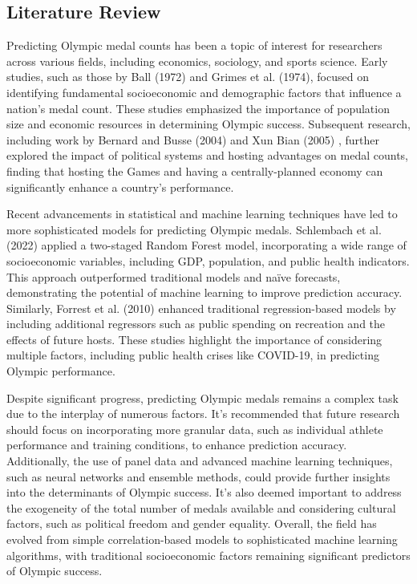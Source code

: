 \documentclass{mcmthesis}
\begin{document}
\subsection{Literature Review}

Predicting Olympic medal counts has been a topic of interest for researchers across various fields, including economics, sociology, and sports science. Early studies, such as those by Ball (1972) and Grimes et al. (1974), \cite{1} focused on identifying fundamental socioeconomic and demographic factors that influence a nation's medal count. These studies emphasized the importance of population size and economic resources in determining Olympic success. Subsequent research, including work by Bernard and Busse (2004) and Xun Bian (2005) \cite{2}, further explored the impact of political systems and hosting advantages on medal counts, finding that hosting the Games and having a centrally-planned economy can significantly enhance a country's performance.

Recent advancements in statistical and machine learning techniques have led to more sophisticated models for predicting Olympic medals. Schlembach et al. (2022) \cite{5} applied a two-staged Random Forest model, incorporating a wide range of socioeconomic variables, including GDP, population, and public health indicators. This approach outperformed traditional models and naïve forecasts, demonstrating the potential of machine learning to improve prediction accuracy. Similarly, Forrest et al. (2010) \cite{4} enhanced traditional regression-based models by including additional regressors such as public spending on recreation and the effects of future hosts. These studies highlight the importance of considering multiple factors, including public health crises like COVID-19, in predicting Olympic performance.

Despite significant progress, predicting Olympic medals remains a complex task due to the interplay of numerous factors. It's recommended that future research should focus on incorporating more granular data, such as individual athlete performance and training conditions, to enhance prediction accuracy. Additionally, the use of panel data and advanced machine learning techniques, such as neural networks and ensemble methods, could provide further insights into the determinants of Olympic success. It's also deemed important to address the exogeneity of the total number of medals available and considering cultural factors, such as political freedom and gender equality. Overall, the field has evolved from simple correlation-based models to sophisticated machine learning algorithms, with traditional socioeconomic factors remaining significant predictors of Olympic success.
\end{document}
